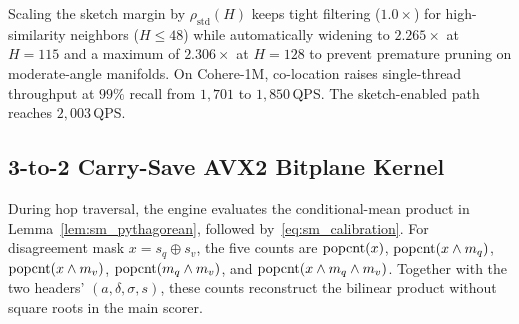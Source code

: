 Scaling the sketch margin by $\rho_{\mathrm{std}}(H)$ keeps tight filtering ($1.0\times$) for high-similarity neighbors ($H \le 48$) while automatically widening to $2.265\times$ at $H=115$ and a maximum of $2.306\times$ at $H=128$ to prevent premature pruning on moderate-angle manifolds.
On {Cohere-1M}, co-location raises single-thread throughput at $99\%$ recall from $1{,}701$ to $1{,}850$\,QPS. The sketch-enabled path reaches $2{,}003$\,QPS.

\subsection{3-to-2 Carry-Save AVX2 Bitplane Kernel}
\label{subsec:csa_kernel}

During hop traversal, the engine evaluates the conditional-mean product in Lemma~\ref{lem:sm_pythagorean}, followed by~\eqref{eq:sm_calibration}. For disagreement mask $x=s_q\oplus s_v$, the five counts are $\operatorname{popcnt}(x)$, $\operatorname{popcnt}(x\wedge m_q)$, $\operatorname{popcnt}(x\wedge m_v)$, $\operatorname{popcnt}(m_q\wedge m_v)$, and $\operatorname{popcnt}(x\wedge m_q\wedge m_v)$. Together with the two headers' $(a,\delta,\sigma,s)$, these counts reconstruct the bilinear product without square roots in the main scorer.


